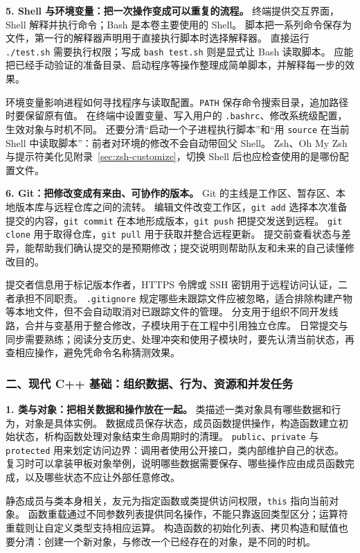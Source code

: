 \textbf{5. Shell 与环境变量：把一次操作变成可以重复的流程。}
终端提供交互界面，Shell 解释并执行命令；Bash 是本卷主要使用的 Shell。
脚本把一系列命令保存为文件，第一行的解释器声明用于直接执行脚本时选择解释器。
直接运行 \texttt{./test.sh} 需要执行权限；写成 \texttt{bash test.sh} 则是显式让 Bash 读取脚本。
应能把已经手动验证的准备目录、启动程序等操作整理成简单脚本，并解释每一步的效果。

环境变量影响进程如何寻找程序与读取配置。\texttt{PATH} 保存命令搜索目录，追加路径时要保留原有值。
在终端中设置变量、写入用户的 \texttt{.bashrc}、修改系统级配置，生效对象与时机不同。
还要分清“启动一个子进程执行脚本”和“用 \texttt{source} 在当前 Shell 中读取脚本”：前者对环境的修改不会自动带回父 Shell。
Zsh、Oh My Zsh 与提示符美化见附录~\ref{sec:zsh-customize}，切换 Shell 后也应检查使用的是哪份配置文件。

\textbf{6. Git：把修改变成有来由、可协作的版本。}
Git 的主线是工作区、暂存区、本地版本库与远程仓库之间的流转。
编辑文件改变工作区，\texttt{git add} 选择本次准备提交的内容，\texttt{git commit} 在本地形成版本，\texttt{git push} 把提交发送到远程。
\texttt{git clone} 用于取得仓库，\texttt{git pull} 用于获取并整合远程更新。
提交前查看状态与差异，能帮助我们确认提交的是预期修改；提交说明则帮助队友和未来的自己读懂修改目的。

提交者信息用于标记版本作者，HTTPS 令牌或 SSH 密钥用于远程访问认证，二者承担不同职责。
\texttt{.gitignore} 规定哪些未跟踪文件应被忽略，适合排除构建产物等本地文件，但不会自动取消对已跟踪文件的管理。
分支用于组织不同开发线路，合并与变基用于整合修改，子模块用于在工程中引用独立仓库。
日常提交与同步需要熟练；阅读分支历史、处理冲突和使用子模块时，要先认清当前状态，再查相应操作，避免凭命令名称猜测效果。

\subsubsection*{二、现代 C++ 基础：组织数据、行为、资源和并发任务}

\textbf{1. 类与对象：把相关数据和操作放在一起。}
类描述一类对象具有哪些数据和行为，对象是具体实例。
数据成员保存状态，成员函数提供操作，构造函数建立初始状态，析构函数处理对象结束生命周期时的清理。
\texttt{public}、\texttt{private} 与 \texttt{protected} 用来划定访问边界：调用者使用公开接口，类内部维护自己的状态。
复习时可以拿装甲板对象举例，说明哪些数据需要保存、哪些操作应由成员函数完成，以及哪些状态不应让外部任意修改。

静态成员与类本身相关，友元为指定函数或类提供访问权限，\texttt{this} 指向当前对象。
函数重载通过不同参数列表提供同名操作，不能只靠返回类型区分；运算符重载则让自定义类型支持相应运算。
构造函数的初始化列表、拷贝构造和赋值也要分清：创建一个新对象，与修改一个已经存在的对象，是不同的时机。

